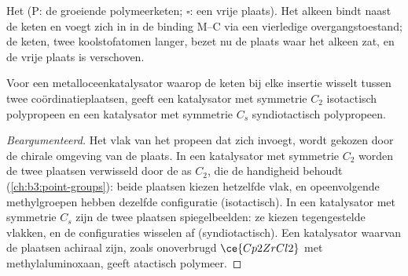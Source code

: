\begin{omfigure}
\par\medskip

{\small Het  (P: de groeiende polymeerketen; $\square$: een
vrije plaats). Het alkeen bindt naast de keten en voegt zich in in de binding M--C
via een vierledige overgangstoestand; de keten, twee koolstofatomen
langer, bezet nu de plaats waar het alkeen zat, en de vrije plaats is
verschoven.}
\end{omfigure}

\begin{proposition}\label{prop:b3:homogeneous-catalysis:tacticity-symmetry}
Voor een metalloceenkatalysator waarop de keten bij elke insertie
wisselt tussen twee coördinatieplaatsen, geeft een katalysator met symmetrie $C_2$ isotactisch
polypropeen en een katalysator met symmetrie $C_s$ syndiotactisch polypropeen.
\end{proposition}

\begin{proof}[Beargumenteerd]
Het vlak van het propeen dat zich invoegt, wordt gekozen door de chirale
omgeving van de plaats. In een katalysator met symmetrie $C_2$ worden de twee plaatsen verwisseld door de as $C_2$,
die de handigheid behoudt (\cref{ch:b3:point-groups}): beide plaatsen
kiezen hetzelfde vlak, en opeenvolgende methylgroepen hebben dezelfde
configuratie (isotactisch).
In een katalysator met symmetrie $C_s$ zijn de twee plaatsen spiegelbeelden: ze kiezen
tegengestelde vlakken, en de configuraties wisselen af (syndiotactisch).
Een katalysator waarvan de plaatsen achiraal zijn, zoals onoverbrugd $\ce{Cp2ZrCl2}$ met methylaluminoxaan, geeft atactisch
polymeer.
\end{proof}


